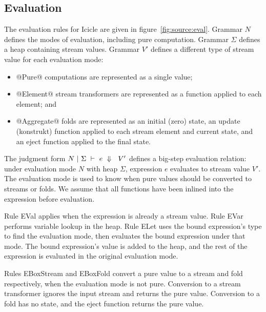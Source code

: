 



\subsection{Evaluation}
The evaluation rules for Icicle are given in figure~\ref{fig:source:eval}.
Grammar $N$ defines the modes of evaluation, including pure computation.
Grammar $\Sigma$ defines a heap containing stream values.
Grammar $V'$ defines a different type of stream value for each evaluation mode:
\begin{itemize}
\item
@Pure@ computations are represented as a single value;
\item
@Element@ stream transformers are represented as a function applied to each element; and
\item
@Aggregate@ folds are represented as an initial (zero) state, an update (konstrukt) function applied to each stream element and current state, and an eject function applied to the final state.
\end{itemize}


The judgment form $N~|~\Sigma~\vdash~e~\Downarrow~~V'$ defines a big-step evaluation relation: under evaluation mode $N$ with heap $\Sigma$, expression $e$ evaluates to stream value $V'$.
The evaluation mode is used to know when pure values should be converted to streams or folds.
We assume that all functions have been inlined into the expression before evaluation.


Rule EVal applies when the expression is already a stream value.
Rule EVar performs variable lookup in the heap.
Rule ELet uses the bound expression's type to find the evaluation mode, then evaluates the bound expression under that mode.
The bound expression's value is added to the heap, and the rest of the expression is evaluated in the original evaluation mode.

Rules EBoxStream and EBoxFold convert a pure value to a stream and fold respectively, when the evaluation mode is not pure.
Conversion to a stream transformer ignores the input stream and returns the pure value.
Conversion to a fold has no state, and the eject function returns the pure value.

